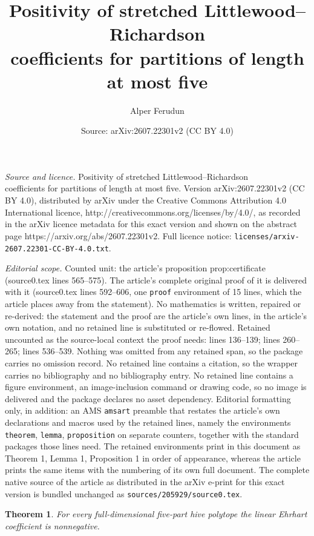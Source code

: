 \documentclass[10pt,a4paper]{amsart}
\title{Positivity of stretched Littlewood--Richardson\\ coefficients for partitions of length at most five}
\author{Alper Ferudun}
\date{Source: arXiv:2607.22301v2 (CC BY 4.0)}
\newtheorem{theorem}{Theorem}
\begin{document}
\maketitle

\noindent\emph{Source and licence.} Positivity of stretched Littlewood--Richardson\\ coefficients for partitions of length at most five. Version arXiv:2607.22301v2 (CC BY 4.0), distributed by arXiv under the Creative Commons Attribution 4.0 International licence, http://creativecommons.org/licenses/by/4.0/, as recorded in the arXiv licence metadata for this exact version and shown on the abstract page https://arxiv.org/abs/2607.22301v2. Full licence notice: \texttt{licenses/arxiv-2607.22301-CC-BY-4.0.txt}.\par\smallskip

\noindent\textit{Editorial scope.} Counted unit: the article's proposition prop:certificate (source0.tex lines 565--575). The article's complete original proof of it is delivered with it (source0.tex lines 592--606, one \texttt{proof} environment of 15 lines, which the article places away from the statement). No mathematics is written, repaired or re-derived: the statement and the proof are the article's own lines, in the article's own notation, and no retained line is substituted or re-flowed.  Retained uncounted as the source-local context the proof needs: lines 136--139; lines 260--265; lines 536--539.  Nothing was omitted from any retained span, so the package carries no omission record.  No retained line contains a citation, so the wrapper carries no bibliography and no bibliography entry.  No retained line contains a figure environment, an image-inclusion command or drawing code, so no image is delivered and the package declares no asset dependency.  Editorial formatting only, in addition: an AMS \texttt{amsart} preamble that restates the article's own declarations and macros used by the retained lines, namely the environments \texttt{theorem}, \texttt{lemma}, \texttt{proposition} on separate counters, together with the standard packages those lines need.  The retained environments print in this document as Theorem 1, Lemma 1, Proposition 1 in order of appearance, whereas the article prints the same items with the numbering of its own full document.  The complete native source of the article as distributed in the arXiv e-print for this exact version is bundled unchanged as \texttt{sources/205929/source0.tex}.
\begin{theorem}\label{thm:linear}
For every full-dimensional five-part hive polytope the linear Ehrhart
coefficient is nonnegative.
\end{theorem}
\end{document}

